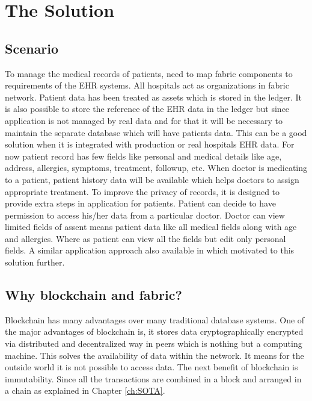 \chapter{The Solution}
\label{ch:thesolution}

%
%
\section{Scenario}
\label{sec:thesolution:Scenario}

To manage the medical records of patients, need to map fabric components to requirements of the EHR systems. All hospitals act as organizations in fabric network. Patient data has been treated as assets which is stored in the ledger. It is also possible to store the reference of the EHR data in the ledger but since application is not managed by real data and for that it will be necessary to maintain the separate database which will have patients data. This can be a good solution when it is integrated with production or real hospitals EHR data. For now patient record has few fields like personal and medical details like age, address, allergies, symptoms, treatment, followup, etc. When doctor is medicating to a patient, patient history data will be available which helps doctors to assign appropriate treatment. To improve the privacy of records, it is designed to provide extra steps in application for patients. Patient can decide to have permission to access his/her data from a particular doctor. Doctor can view limited fields of assent means patient data like all medical fields along with age and allergies. Where as patient can view all the fields but edit only personal fields. 
A similar application approach also available in \cite{Dubovitskaya2020} which motivated to this solution further.

%
%
\section{Why blockchain and fabric?}
\label{sec:thesolution:whyblockchain}

Blockchain has many advantages over many traditional database systems. One of the major advantages of blockchain is, it stores data cryptographically encrypted via distributed and decentralized way in peers which is nothing but a computing machine. This solves the availability of data within the network. It means for the outside world it is not possible to access data. The next benefit of blockchain is immutability. Since all the transactions are combined in a block and arranged in a chain as explained in Chapter \ref{ch:SOTA}. 

